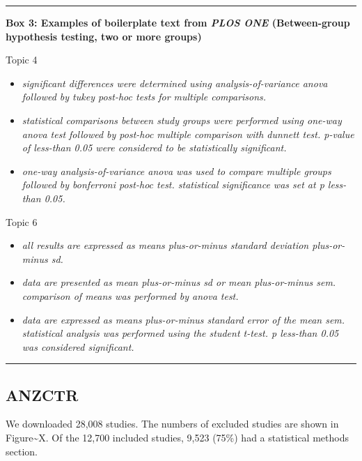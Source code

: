 \documentclass[
]{article}
\providecommand{\tightlist}{%
  \setlength{\itemsep}{0pt}\setlength{\parskip}{0pt}}
\begin{document}
\begin{center}\rule{0.5\linewidth}{0.5pt}\end{center}

\textbf{Box 3: Examples of boilerplate text from \emph{PLOS ONE} (Between-group hypothesis testing, two or more groups)}

Topic 4

\begin{itemize}
\tightlist
\item
  \emph{significant differences were determined using analysis-of-variance anova followed by tukey post-hoc tests for multiple comparisons.}
\item
  \emph{statistical comparisons between study groups were performed using one-way anova test followed by post-hoc multiple comparison with dunnett test. p-value of less-than 0.05 were considered to be statistically significant.}
\item
  \emph{one-way analysis-of-variance anova was used to compare multiple groups followed by bonferroni post-hoc test. statistical significance was set at p less-than 0.05.}
\end{itemize}

Topic 6

\begin{itemize}
\tightlist
\item
  \emph{all results are expressed as means plus-or-minus standard deviation plus-or-minus sd.}
\item
  \emph{data are presented as mean plus-or-minus sd or mean plus-or-minus sem. comparison of means was performed by anova test.}
\item
  \emph{data are expressed as means plus-or-minus standard error of the mean sem. statistical analysis was performed using the student t-test. p less-than 0.05 was considered significant.}
\end{itemize}

\begin{center}\rule{0.5\linewidth}{0.5pt}\end{center}

\hypertarget{anzctr}{%
\subsection{ANZCTR}\label{anzctr}}

We downloaded 28,008 studies. The numbers of excluded studies are shown in Figure\textasciitilde X.
Of the 12,700 included studies, 9,523 (75\%) had a statistical methods section.
\end{document}
